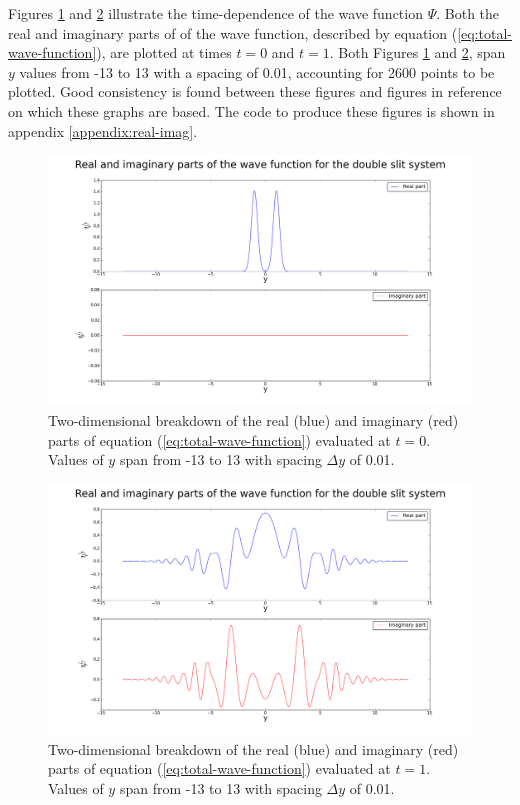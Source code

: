 \documentclass[10pt, reqno]{article}
\begin{document}
  Figures \ref{fig:2d0} and \ref{fig:2d1} illustrate the time-dependence of the wave function $\Psi$.
  Both the real and imaginary parts of of the wave function, described by equation (\ref{eq:total-wave-function}), are plotted at times $t=0$ and $t=1$. 
  Both Figures \ref{fig:2d0} and \ref{fig:2d1}, span $y$ values from -13 to 13 with a spacing of 0.01, accounting for 2600 points to be plotted.
  Good consistency is found between these figures and figures in reference \cite{guay-double-slit} on which these graphs are based.
  The code to produce these figures is shown in appendix \ref{appendix:real-imag}.

    \begin{figure}[!ht]
      \centerline{\includegraphics[scale=.3]{./imgs/double-slit-real-imaginary-parts-t0.png}}
      \caption{
        Two-dimensional breakdown of the real (blue) and imaginary (red) parts of equation (\ref{eq:total-wave-function}) evaluated at $t=0$.
        Values of $y$ span from -13 to 13 with spacing $\Delta y$ of 0.01.
      }
      \label{fig:2d0}
    \end{figure}
    \begin{figure}[!ht]
      \centerline{\includegraphics[scale=.3]{./imgs/double-slit-real-imaginary-parts-t1.png}}
      \caption{
        Two-dimensional breakdown of the real (blue) and imaginary (red) parts of equation (\ref{eq:total-wave-function}) evaluated at $t=1$.
        Values of $y$ span from -13 to 13 with spacing $\Delta y$ of 0.01.
      }
      \label{fig:2d1}
    \end{figure}
\end{document}
